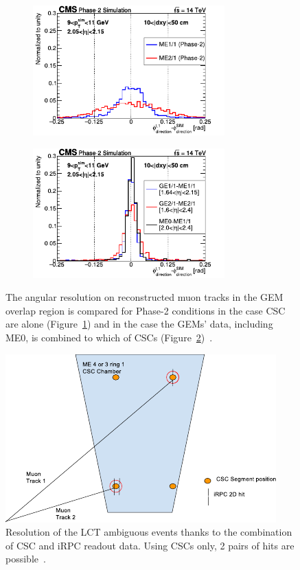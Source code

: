 	\begin{figure}[H]
		\begin{subfigure}{0.5\linewidth}
			\centering
			\includegraphics[height=5cm]{fig/chapt3/CSC-angular-res.pdf}
			\caption{\label{fig:CSC-GEM-res:A}}
		\end{subfigure}
		\begin{subfigure}{0.5\linewidth}
			\centering
			\includegraphics[height=5cm]{fig/chapt3/GEM-angular-res.pdf}
			\caption{\label{fig:CSC-GEM-res:B}}
		\end{subfigure}
		\caption{\label{fig:CSC-GEM-res} The angular resolution on reconstructed muon tracks in the GEM overlap region  is compared for Phase-2 conditions in the case CSC are alone (Figure~\ref{fig:CSC-GEM-res:A}) and in the case the GEMs' data, including ME0, is combined to which of CSCs (Figure~\ref{fig:CSC-GEM-res:B})~\cite{PHASEIITP}.}
	\end{figure}

	\begin{figure}[H]
		\centering
		\includegraphics[width=.8\linewidth]{fig/chapt3/CSC-LCT-ambiguity.pdf}
		\caption{\label{fig:LCT-ambiguity} Resolution of the LCT ambiguous events thanks to the combination of CSC and iRPC readout data. Using CSCs only, 2 pairs of hits are possible~\cite{PHASEIITP}.}
	\end{figure}

